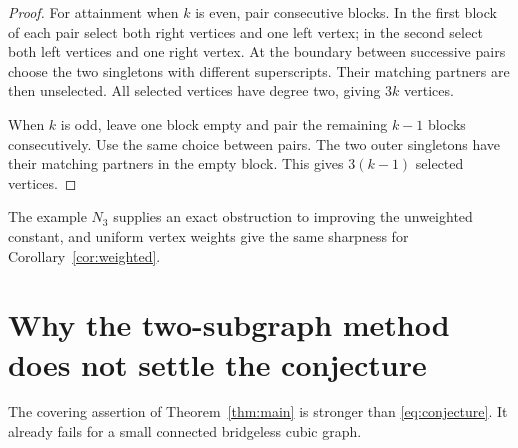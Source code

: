 \documentclass[11pt]{article}
\begin{document}
\begin{proof}
For attainment when $k$ is even, pair consecutive blocks.
In the first block of each pair select both right vertices and one
left vertex; in the second select both left vertices and one right
vertex. At the boundary between successive pairs choose the two
singletons with different superscripts. Their matching partners are
then unselected. All selected vertices have degree two, giving $3k$
vertices.

When $k$ is odd, leave one block empty and pair the remaining $k-1$
blocks consecutively. Use the same choice between pairs. The two
outer singletons have their matching partners in the empty block.
This gives $3(k-1)$ selected vertices.
\end{proof}
The example $N_3$ supplies an exact obstruction to improving the
unweighted constant, and uniform vertex weights give the same
sharpness for Corollary~\ref{cor:weighted}.

\section{Why the two-subgraph method does not settle the conjecture}
The covering assertion of Theorem~\ref{thm:main} is stronger than
\eqref{eq:conjecture}. It already fails for a small connected bridgeless
cubic graph.
\end{document}
